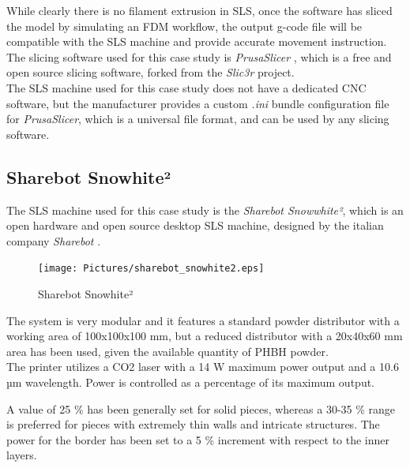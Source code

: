 \documentclass{article}
\begin{document}
        While clearly there is no filament extrusion in SLS, once the software has sliced the model by simulating 
        an FDM workflow, the output g-code file will be compatible with the SLS machine and provide 
        accurate movement instruction. \\

        The slicing software used for this case study is \textit{PrusaSlicer} \autocites{PrusaSlicer}, 
        which is a free and open source slicing software, forked from the \textit{Slic3r} project. \\

        The SLS machine used for this case study does not have a dedicated CNC software, but the 
        manufacturer provides a custom \textit{.ini} bundle configuration file for \textit{PrusaSlicer}, which is
        a universal file format, and can be used by any slicing software. \\
        
        
        \clearpage

        \subsection{Sharebot Snowhite²\label{Sharebot_Snowhite²}}

        The SLS machine used for this case study is the \textit{Sharebot Snowwhite²}, which is an open hardware and 
        open source desktop SLS machine, designed by the italian company \textit{Sharebot} \autocites{Sharebot}. \\ 

        \begin{figure}[h!]
            \centering
            \texttt{[image: Pictures/sharebot\_snowhite2.eps]}
            \caption{Sharebot Snowhite²}
            \label{fig:Sharebot_Snowhite2}
        \end{figure}

        The system is very modular and it features a standard powder distributor with a working area of 
        100x100x100 mm, but a reduced distributor with a 20x40x60 mm area has been used, given the available 
        quantity of PHBH powder.  \\ 

        The printer utilizes a CO2 laser with a 14 W maximum power output and a 10.6 µm wavelength. Power is controlled as 
        a percentage of its maximum output.  

        A value of 25 \% has been generally set for solid pieces, whereas a 30-35 \% range is preferred for pieces with extremely thin walls and intricate structures.  
        The power for the border has been set to a 5 \% increment with respect to the inner layers. \\ 
\end{document}
